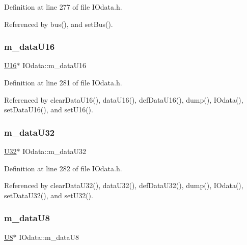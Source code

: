 Definition at line 277 of file I\+Odata.\+h.



Referenced by bus(), and set\+Bus().

\mbox{\label{classIOdata_a8d698e077b7898009691b9086a3e6453}} 
\subsubsection{\texorpdfstring{m\+\_\+data\+U16}{m\_dataU16}}
{\footnotesize\ttfamily \hyperlink{classIOdata_a1eb45b348534a7c19a4a99b746e693ff}{U16}$\ast$ I\+Odata\+::m\+\_\+data\+U16\hspace{0.3cm}{\ttfamily [private]}}



Definition at line 281 of file I\+Odata.\+h.



Referenced by clear\+Data\+U16(), data\+U16(), def\+Data\+U16(), dump(), I\+Odata(), set\+Data\+U16(), and set\+U16().

\mbox{\label{classIOdata_a247cdaefd87084e3cad1d530d592d99a}} 
\subsubsection{\texorpdfstring{m\+\_\+data\+U32}{m\_dataU32}}
{\footnotesize\ttfamily \hyperlink{classIOdata_a96fb57f5fcd87b708743abd3c86a5198}{U32}$\ast$ I\+Odata\+::m\+\_\+data\+U32\hspace{0.3cm}{\ttfamily [private]}}



Definition at line 282 of file I\+Odata.\+h.



Referenced by clear\+Data\+U32(), data\+U32(), def\+Data\+U32(), dump(), I\+Odata(), set\+Data\+U32(), and set\+U32().

\mbox{\label{classIOdata_a9c4c0dc5104f7f3b170e30ab78fe61e7}} 
\subsubsection{\texorpdfstring{m\+\_\+data\+U8}{m\_dataU8}}
{\footnotesize\ttfamily \hyperlink{classIOdata_a18d1354b7cdaf0f8a8001fdbb3ced418}{U8}$\ast$ I\+Odata\+::m\+\_\+data\+U8\hspace{0.3cm}{\ttfamily [private]}}



